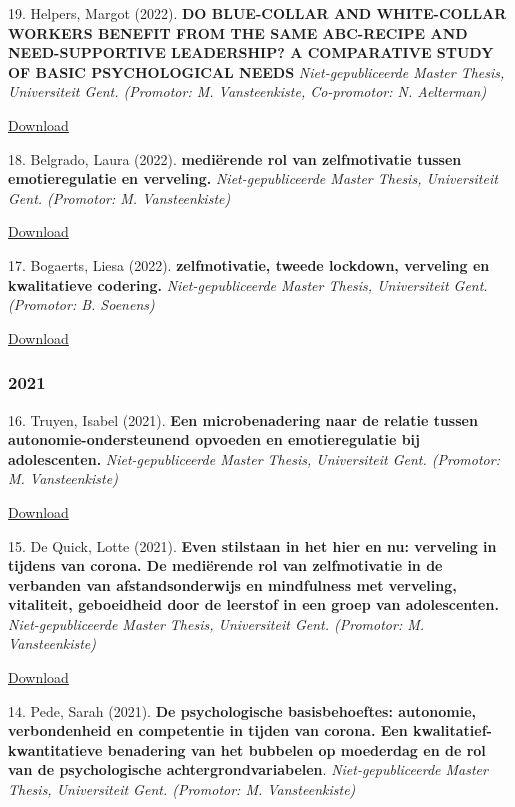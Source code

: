 \documentclass[
]{article}
\begin{document}
19. Helpers, Margot (2022). \textbf{DO BLUE-COLLAR AND WHITE-COLLAR
WORKERS BENEFIT FROM THE SAME ABC-RECIPE AND NEED-SUPPORTIVE LEADERSHIP?
A COMPARATIVE STUDY OF BASIC PSYCHOLOGICAL NEEDS}
\emph{Niet-gepubliceerde Master Thesis, Universiteit Gent. (Promotor: M.
Vansteenkiste, Co-promotor: N. Aelterman)}

\href{download/sciencs/masterproeven/Masterproef_Margot_Helpers_01708777.pdf}{Download
}

18. Belgrado, Laura (2022). \textbf{mediërende rol van zelfmotivatie
tussen emotieregulatie en verveling.} \emph{Niet-gepubliceerde Master
Thesis, Universiteit Gent. (Promotor: M. Vansteenkiste)}

\href{download/sciencs/masterproeven/MPII_2022_Laura_Belgrado_JW_MV_finaal.pdf}{Download
}

17. Bogaerts, Liesa (2022). \textbf{zelfmotivatie, tweede lockdown,
verveling en kwalitatieve codering.} \emph{Niet-gepubliceerde Master
Thesis, Universiteit Gent. (Promotor: B. Soenens)}

\href{download/sciencs/masterproeven/Masterproef-II-Liesa-Bogaerts-01708554.pdf}{Download
}

\hypertarget{section-7}{%
\subsubsection{2021}\label{section-7}}

16. Truyen, Isabel (2021). \textbf{Een microbenadering naar de relatie
tussen autonomie-ondersteunend opvoeden en emotieregulatie bij
adolescenten.} \emph{Niet-gepubliceerde Master Thesis, Universiteit
Gent. (Promotor: M. Vansteenkiste) }

\href{download/sciencs/masterproeven/Masterproef_II_IsabelTruyen_DEFINITIEF.pdf}{Download
}

15. De Quick, Lotte (2021). \textbf{Even stilstaan in het hier en nu:
verveling in tijdens van corona. De mediërende rol van zelfmotivatie in
de verbanden van afstandsonderwijs en mindfulness met verveling,
vitaliteit, geboeidheid door de leerstof in een groep van adolescenten.}
\emph{Niet-gepubliceerde Master Thesis, Universiteit Gent. (Promotor: M.
Vansteenkiste)}

\href{download/sciencs/masterproeven/Masterproef_LotteDeQuick_01601947.pdf}{Download
}

14. Pede, Sarah (2021). \textbf{De psychologische basisbehoeftes:
autonomie, verbondenheid en competentie in tijden van corona. Een
kwalitatief-kwantitatieve benadering van het bubbelen op moederdag en de
rol van de psychologische achtergrondvariabelen}.
\emph{Niet-gepubliceerde Master Thesis, Universiteit Gent. (Promotor: M.
Vansteenkiste)}
\end{document}
